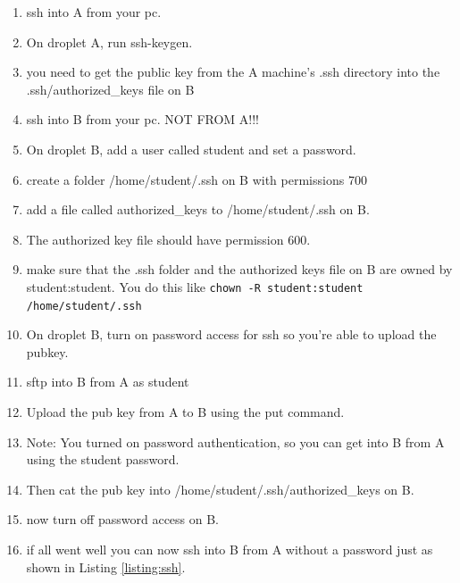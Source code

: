 \documentclass[12pt]{article}
\begin{document}
\begin{enumerate}
\item ssh into A from your pc.
\item On droplet A, run ssh-keygen.
\item you need to get the public key from the A machine's .ssh directory into the 
.ssh/authorized\_keys file on B
\item ssh into B from your pc. NOT FROM A!!!
\item On droplet B, add a user called student and set a password.
\item create a folder /home/student/.ssh on B with permissions 700
\item add a file called authorized\_keys to /home/student/.ssh on B. 
\item The authorized key file should have permission 600.
\item make sure that the .ssh folder and the authorized keys file on B are owned by student:student. You do this like \verb|chown -R student:student /home/student/.ssh|
\item On droplet B, turn on password access for ssh so you're able to upload the pubkey.
\item sftp into B from A as student
\item Upload the pub key from A to B using the put command.
\item Note: You turned on password authentication, so you can get into B from A using the student password.
\item Then cat the pub key into /home/student/.ssh/authorized\_keys on B.
\item now turn off password access on B.
\item if all went well you can now ssh into B from A without a password just as shown in Listing \ref{listing:ssh}.
\end{enumerate}
\end{document}
